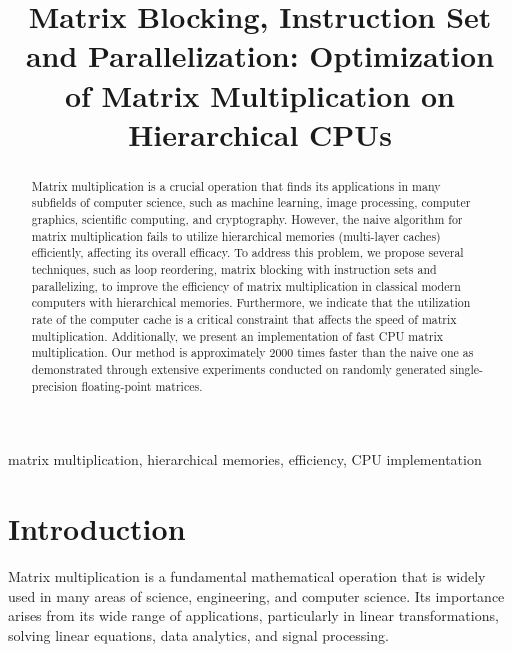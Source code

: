 \documentclass[conference]{IEEEtran}
\begin{document}
	
	\title{Matrix Blocking, Instruction Set and Parallelization: Optimization of Matrix Multiplication on Hierarchical CPUs}
	\author{
	}
	
	\maketitle \thispagestyle{plain}
	\setcounter{page}{1}
	\pagestyle{plain}

	\begin{abstract}
		Matrix multiplication is a crucial operation that finds its applications in many subfields of computer science, such as machine learning, image processing, computer graphics, scientific computing, and cryptography. However, the naive algorithm for matrix multiplication fails to utilize hierarchical memories (multi-layer caches) efficiently, affecting its overall efficacy. To address this problem, we propose several techniques, such as loop reordering, matrix blocking with instruction sets and parallelizing, to improve the efficiency of matrix multiplication in classical modern computers with hierarchical memories. Furthermore, we indicate that the utilization rate of the computer cache is a critical constraint that affects the speed of matrix multiplication. Additionally, we present an implementation of fast CPU matrix multiplication. Our method is approximately 2000 times faster than the naive one as demonstrated through extensive experiments conducted on randomly generated single-precision floating-point matrices.
	\end{abstract}
	
	\begin{IEEEkeywords}
		matrix multiplication, hierarchical memories, efficiency, CPU implementation
	\end{IEEEkeywords}
	
	\section{Introduction}
	Matrix multiplication is a fundamental mathematical operation that is widely used in many areas of science, engineering, and computer science. Its importance arises from its wide range of applications, particularly in linear transformations, solving linear equations, data analytics, and signal processing. 
	
\end{document}
